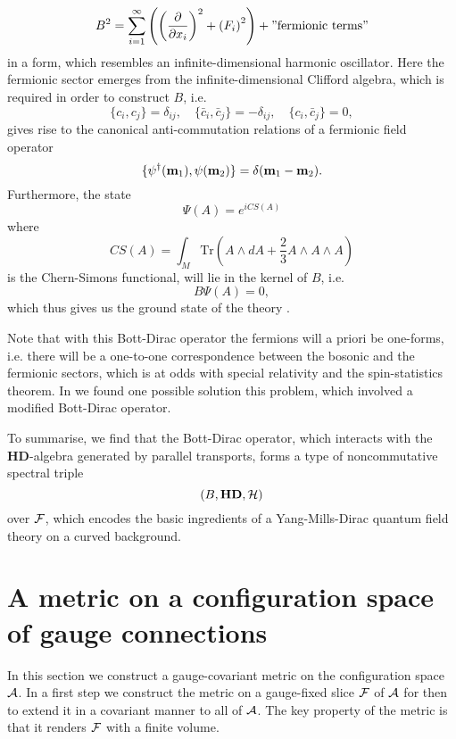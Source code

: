 \documentclass[letterpaper,12pt]{article}
\def\d{\delta}
\def\ca{{\cal A}}
\def\cf{{\cal F}}
\def\ch{{\cal H}}
\newcommand{\pa}{\partial}
\begin{document}
$$
B^2 = \sum_{i=1}^\infty \left( \left(\frac{\pa}{\pa x_i}\right)^2 +  \left( F_i\right)^2 \right) + "\mbox{fermionic terms}"
$$
in a form, which resembles an infinite-dimensional harmonic oscillator. Here the fermionic sector emerges from the infinite-dimensional Clifford algebra, which is required in order to construct $B$, i.e.
$$
\{ c_i , {c}_j \} = \d_{ij},\quad \{ \bar{c}_i , \bar{c}_j \} = -\d_{ij},\quad \{ c_i , \bar{c}_j \} = 0,
$$
gives rise to the canonical anti-commutation relations of a fermionic field operator \cite{Aastrup:2020jcf}
$$
\{  {\psi}^\dagger({\bf m}_1) , {\psi}({\bf m}_2) \} = \d({\bf m}_1-{\bf m}_2).
$$
Furthermore, the state
$$
\Psi(A) = e^{i CS(A)}
$$
where
$$
CS(A) = \int_M \mbox{Tr} \left( A\wedge dA + \frac{2}{3} A\wedge A \wedge A \right)
$$
is the Chern-Simons functional, will lie in the kernel of $B$, i.e.
$$
B \Psi(A) =0,
$$
which thus gives us the ground state of the theory \cite{Aastrup:2020jcf}.



Note that with this Bott-Dirac operator the fermions will a priori be one-forms, i.e. there will be a one-to-one correspondence between the bosonic and the fermionic sectors, which is at odds with special relativity and the spin-statistics theorem. 
In \cite{Aastrup:2020jcf} we found one possible solution this problem, which involved a modified Bott-Dirac operator.
  





To summarise, we find that the Bott-Dirac operator, which interacts with the ${\mathbf{ HD}}$-algebra generated by parallel transports, forms a type of noncommutative spectral triple
$$
(B, {\mathbf{ HD}}, \ch )
$$
over $\cf$,
which encodes the basic ingredients of a Yang-Mills-Dirac quantum field theory on a curved background.











\section{A metric on a configuration space of gauge connections}

 In this section we construct a gauge-covariant metric on the configuration space $\ca$. In a first step we construct the metric on a gauge-fixed slice $\cf$ of $\ca$ for then to extend it in a covariant manner to all of $\ca$. %
 The key property of the metric is that it renders $\cf$ with a finite volume. \\
 
\end{document}

